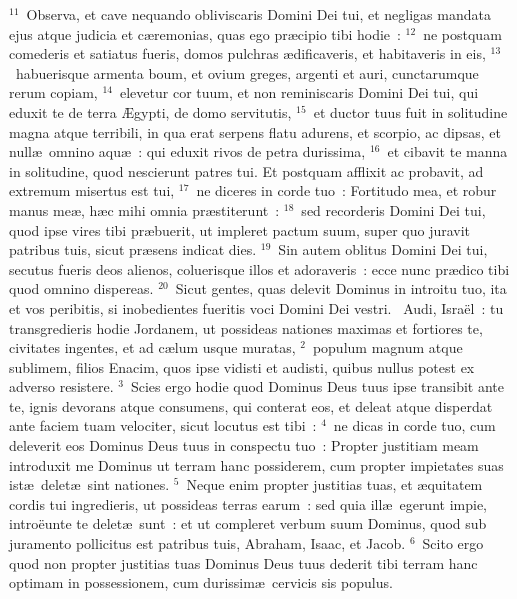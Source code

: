 ${}^{11}$~Observa, et cave nequando obliviscaris Domini Dei tui, et negligas mandata ejus atque judicia et c\ae remonias, quas ego pr\ae cipio tibi hodie~:
${}^{12}$~ne postquam comederis et satiatus fueris, domos pulchras \ae dificaveris, et habitaveris in eis,
${}^{13}$~habuerisque armenta boum, et ovium greges, argenti et auri, cunctarumque rerum copiam,
${}^{14}$~elevetur cor tuum, et non reminiscaris Domini Dei tui, qui eduxit te de terra \AE gypti, de domo servitutis,
${}^{15}$~et ductor tuus fuit in solitudine magna atque terribili, in qua erat serpens flatu adurens, et scorpio, ac dipsas, et null\ae\ omnino aqu\ae~: qui eduxit rivos de petra durissima,
${}^{16}$~et cibavit te manna in solitudine, quod nescierunt patres tui. Et postquam afflixit ac probavit, ad extremum misertus est tui,
${}^{17}$~ne diceres in corde tuo~: Fortitudo mea, et robur manus me\ae , h\ae c mihi omnia pr\ae stiterunt~:
${}^{18}$~sed recorderis Domini Dei tui, quod ipse vires tibi pr\ae buerit, ut impleret pactum suum, super quo juravit patribus tuis, sicut pr\ae sens indicat dies.
${}^{19}$~Sin autem oblitus Domini Dei tui, secutus fueris deos alienos, coluerisque illos et adoraveris~: ecce nunc pr\ae dico tibi quod omnino dispereas.
${}^{20}$~Sicut gentes, quas delevit Dominus in introitu tuo, ita et vos peribitis, si inobedientes fueritis voci Domini Dei vestri.
~\lettrine[lines=10,image=true,loversize=0.05,lraise=-0.03]{A}{}udi, Isra\"el~: tu transgredieris hodie Jordanem, ut possideas nationes maximas et fortiores te, civitates ingentes, et ad c\ae lum usque muratas,
${}^{2}$~populum magnum atque sublimem, filios Enacim, quos ipse vidisti et audisti, quibus nullus potest ex adverso resistere.
${}^{3}$~Scies ergo hodie quod Dominus Deus tuus ipse transibit ante te, ignis devorans atque consumens, qui conterat eos, et deleat atque disperdat ante faciem tuam velociter, sicut locutus est tibi~:
${}^{4}$~ne dicas in corde tuo, cum deleverit eos Dominus Deus tuus in conspectu tuo~: Propter justitiam meam introduxit me Dominus ut terram hanc possiderem, cum propter impietates suas ist\ae\ delet\ae\ sint nationes.
${}^{5}$~Neque enim propter justitias tuas, et \ae quitatem cordis tui ingredieris, ut possideas terras earum~: sed quia ill\ae\ egerunt impie, intro\"eunte te delet\ae\ sunt~: et ut compleret verbum suum Dominus, quod sub juramento pollicitus est patribus tuis, Abraham, Isaac, et Jacob.
${}^{6}$~Scito ergo quod non propter justitias tuas Dominus Deus tuus dederit tibi terram hanc optimam in possessionem, cum durissim\ae\ cervicis sis populus.


